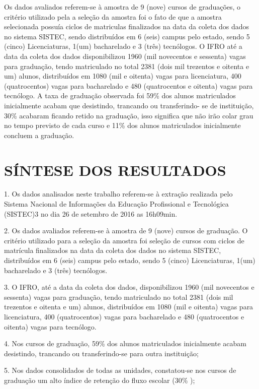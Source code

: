 \documentclass[article,12pt,onesidea,4paper,english,brazil]{abntex2}
\begin{document}
	Os dados avaliados referem-se à amostra de 9 (nove) cursos de graduações, o critério
	utilizado pela a seleção da amostra foi o fato de que a amostra selecionada possuía ciclos de
	matriculas finalizados na data da coleta dos dados no sistema SISTEC, sendo distribuídos em 6
	(seis) campus pelo estado, sendo 5 (cinco) Licenciaturas, 1(um) bacharelado e 3 (três) tecnólogos.
	O IFRO até a data da coleta dos dados disponibilizou 1960 (mil novecentos e sessenta) vagas para
	graduação, tendo matriculado no total 2381 (dois mil trezentos e oitenta e um) alunos,
	distribuídos em 1080 (mil e oitenta) vagas para licenciatura, 400 (quatrocentos) vagas para
	bacharelado e 480 (quatrocentos e oitenta) vagas para tecnólogo. A taxa de graduação observada
	foi 59\% dos alunos matriculados inicialmente acabam que desistindo, trancando ou transferindo-
	se de instituição, 30\% acabaram ficando retido na graduação, isso significa que não irão colar
	grau no tempo previsto de cada curso e 11\% dos alunos matriculados inicialmente concluem a
	graduação.
	
	\section*{SÍNTESE DOS RESULTADOS}
	
	1. Os dados analisados neste trabalho referem-se à extração realizada pelo Sistema Nacional
	de Informações da Educação Profissional e Tecnológica (SISTEC)3 no dia 26 de setembro de 2016 as 16h09min.
	
	2. Os dados avaliados referem-se à amostra de 9 (nove) cursos de graduação. O critério
	utilizado para a seleção da amostra foi seleção de cursos com ciclos de matrícula
	finalizados na data da coleta dos dados no sistema SISTEC, distribuídos em 6 (seis)
	campus pelo estado, sendo 5 (cinco) Licenciaturas, 1(um) bacharelado e 3 (três)
	tecnólogos.
	
	3. O IFRO, até a data da coleta dos dados, disponibilizou 1960 (mil novecentos e sessenta)
	vagas para graduação, tendo matriculado no total 2381 (dois mil trezentos e oitenta e um)
	alunos, distribuídos em 1080 (mil e oitenta) vagas para licenciatura, 400 (quatrocentos)
	vagas para bacharelado e 480 (quatrocentos e oitenta) vagas para tecnólogo.
	
	4. Nos cursos de graduação, 59\% dos alunos matriculados inicialmente acabam desistindo,
	trancando ou transferindo-se para outra instituição;
	
	5. Nos dados consolidados de todas as unidades, constatou-se nos cursos de graduação um
	alto índice de retenção do fluxo escolar (30\% );
\end{document}

